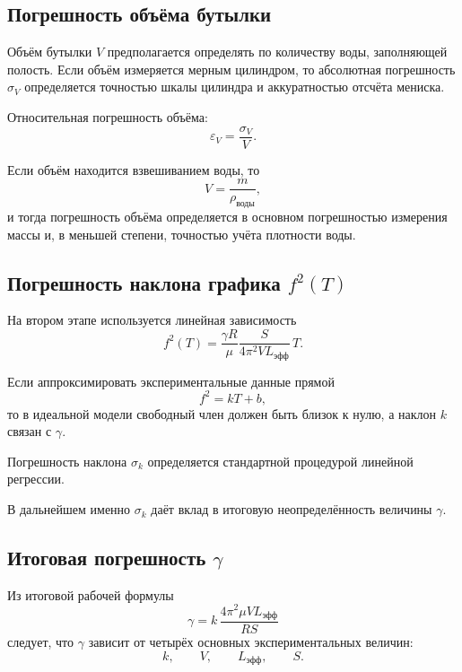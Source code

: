 \documentclass[a4paper,12pt]{article}
\begin{document}
	\subsection{Погрешность объёма бутылки}
	
	Объём бутылки \(V\) предполагается определять по количеству воды, заполняющей полость. Если объём измеряется мерным цилиндром, то абсолютная погрешность \(\sigma_V\) определяется точностью шкалы цилиндра и аккуратностью отсчёта мениска.
	
	Относительная погрешность объёма:
	\begin{equation}
		\varepsilon_V=\frac{\sigma_V}{V}.
	\end{equation}
	
	Если объём находится взвешиванием воды, то
	\[
	V=\frac{m}{\rho_{\text{воды}}},
	\]
	и тогда погрешность объёма определяется в основном погрешностью измерения массы и, в меньшей степени, точностью учёта плотности воды.
	
	\subsection{Погрешность наклона графика \(f^2(T)\)}
	
	На втором этапе используется линейная зависимость
	\begin{equation}
		f^2(T)=
		\frac{\gamma R}{\mu}
		\frac{S}{4\pi^2 V L_{\text{эфф}}}
		\,T.
		\label{eq:err_f2T}
	\end{equation}
	
	Если аппроксимировать экспериментальные данные прямой
	\[
	f^2=kT+b,
	\]
	то в идеальной модели свободный член должен быть близок к нулю, а наклон \(k\) связан с \(\gamma\).
	
	Погрешность наклона \(\sigma_k\) определяется стандартной процедурой линейной регрессии. 
	
	В дальнейшем именно \(\sigma_k\) даёт вклад в итоговую неопределённость величины \(\gamma\).
	
	\subsection{Итоговая погрешность \(\gamma\)}
	
	Из итоговой рабочей формулы
	\begin{equation}
		\gamma=
		k\,\frac{4\pi^2 \mu V L_{\text{эфф}}}{RS}
		\label{eq:gamma_err_base}
	\end{equation}
	следует, что \(\gamma\) зависит от четырёх основных экспериментальных величин:
	\[
	k,\qquad V,\qquad L_{\text{эфф}},\qquad S.
	\]
	
\end{document}
